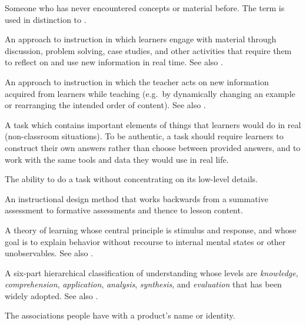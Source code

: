 
\begin{description}

 Someone who has never
encountered concepts or material before. The term is used in distinction to
.

 An approach to instruction in which
learners engage with material through discussion, problem solving, case studies,
and other activities that require them to reflect on and use new information in
real time.  See also .

 An approach to instruction in which the
teacher acts on new information acquired from learners while teaching (e.g.\ by
dynamically changing an example or rearranging the intended order of content).
See also .

 A task which contains important
elements of things that learners would do in real (non-classroom situations). To
be authentic, a task should require learners to construct their own answers
rather than choose between provided answers, and to work with the same tools and
data they would use in real life.

 The ability to do a task without
concentrating on its low-level details.

 An instructional design method that
works backwards from a summative assessment to formative assessments and thence
to lesson content.

 A theory of learning whose central principle
is stimulus and response, and whose goal is to explain behavior without recourse
to internal mental states or other unobservables. See
also .

 A six-part hierarchical
classification of understanding whose levels are \emph{knowledge},
\emph{comprehension}, \emph{application}, \emph{analysis}, \emph{synthesis}, and
\emph{evaluation} that has been widely adopted. See also
.

 The associations people have with a product's name or
identity.


\end{description}
